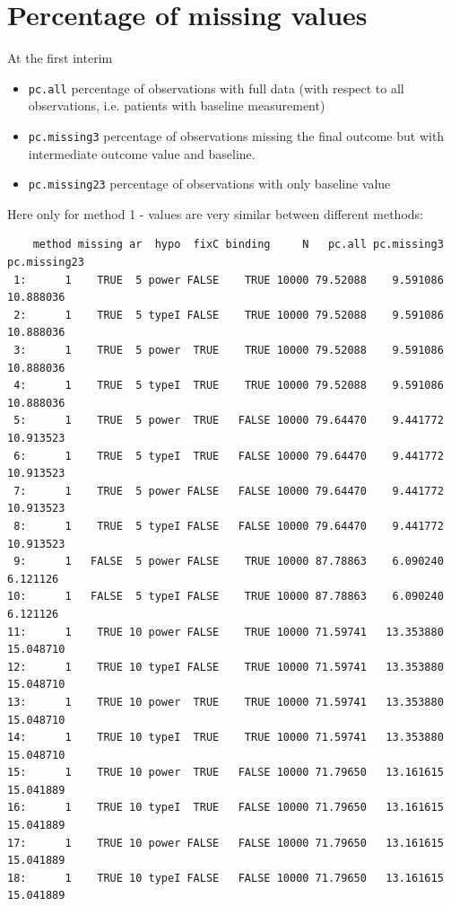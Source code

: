 \documentclass[12pt]{article}
\begin{document}
\clearpage

\section{Percentage of missing values}
\label{sec:orgb4682ca}

At the first interim
\begin{itemize}
\item \texttt{pc.all} percentage of observations with full data (with respect to
all observations, i.e. patients with baseline measurement)
\item \texttt{pc.missing3} percentage of observations missing the final outcome
but with intermediate outcome value and baseline.
\item \texttt{pc.missing23} percentage of observations with only baseline value
\end{itemize}

Here only for method 1 - values are very similar between different
methods:
\begin{verbatim}
    method missing ar  hypo  fixC binding     N   pc.all pc.missing3 pc.missing23
 1:      1    TRUE  5 power FALSE    TRUE 10000 79.52088    9.591086    10.888036
 2:      1    TRUE  5 typeI FALSE    TRUE 10000 79.52088    9.591086    10.888036
 3:      1    TRUE  5 power  TRUE    TRUE 10000 79.52088    9.591086    10.888036
 4:      1    TRUE  5 typeI  TRUE    TRUE 10000 79.52088    9.591086    10.888036
 5:      1    TRUE  5 power  TRUE   FALSE 10000 79.64470    9.441772    10.913523
 6:      1    TRUE  5 typeI  TRUE   FALSE 10000 79.64470    9.441772    10.913523
 7:      1    TRUE  5 power FALSE   FALSE 10000 79.64470    9.441772    10.913523
 8:      1    TRUE  5 typeI FALSE   FALSE 10000 79.64470    9.441772    10.913523
 9:      1   FALSE  5 power FALSE    TRUE 10000 87.78863    6.090240     6.121126
10:      1   FALSE  5 typeI FALSE    TRUE 10000 87.78863    6.090240     6.121126
11:      1    TRUE 10 power FALSE    TRUE 10000 71.59741   13.353880    15.048710
12:      1    TRUE 10 typeI FALSE    TRUE 10000 71.59741   13.353880    15.048710
13:      1    TRUE 10 power  TRUE    TRUE 10000 71.59741   13.353880    15.048710
14:      1    TRUE 10 typeI  TRUE    TRUE 10000 71.59741   13.353880    15.048710
15:      1    TRUE 10 power  TRUE   FALSE 10000 71.79650   13.161615    15.041889
16:      1    TRUE 10 typeI  TRUE   FALSE 10000 71.79650   13.161615    15.041889
17:      1    TRUE 10 power FALSE   FALSE 10000 71.79650   13.161615    15.041889
18:      1    TRUE 10 typeI FALSE   FALSE 10000 71.79650   13.161615    15.041889
\end{verbatim}
\end{document}

